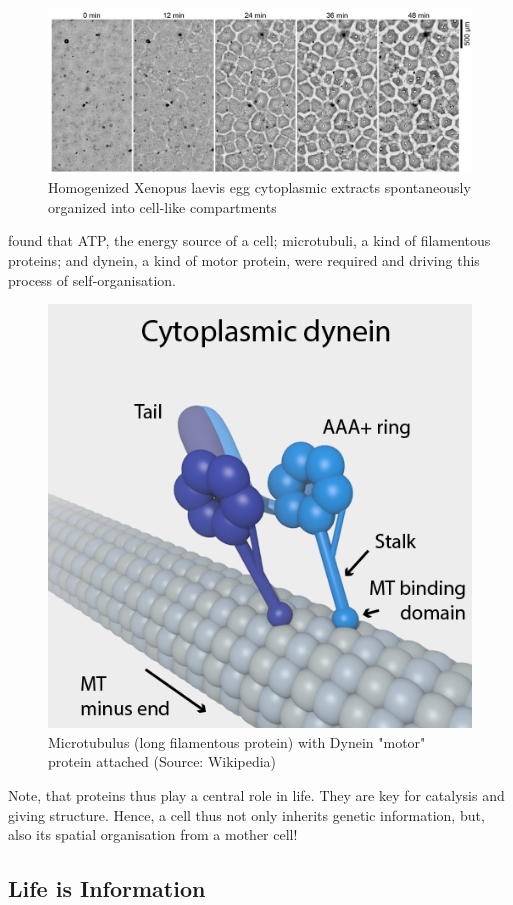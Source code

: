 \documentclass[
  11pt,
]{book}
\begin{document}
\begin{figure}

{\centering \includegraphics[width=1\linewidth]{./figs/selforganisation} 

}

\caption{Homogenized Xenopus laevis egg cytoplasmic extracts spontaneously organized into cell-like compartments \citep{Cheng2019}}\label{fig:selforganisation}
\end{figure}

\citet{Cheng2019} found that ATP, the energy source of a cell; microtubuli, a kind of filamentous proteins; and dynein, a kind of motor protein, were required and driving this process of self-organisation.

\begin{figure}

{\centering \includegraphics[width=0.3\linewidth]{./figs/DyneinHeavyChainOnMT} 

}

\caption{Microtubulus (long filamentous protein) with Dynein "motor" protein attached (Source:  Wikipedia)}\label{fig:dynein}
\end{figure}

Note, that proteins thus play a central role in life. They are key for catalysis and giving structure. Hence, a cell thus not only inherits genetic information, but, also its spatial organisation from a mother cell!

\newpage

\hypertarget{lifeInformation}{%
\subsection{Life is Information}\label{lifeInformation}}
\end{document}
